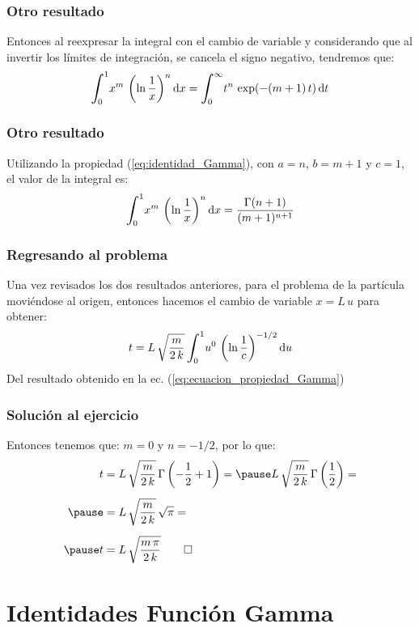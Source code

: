 \documentclass[12pt]{beamer}
\begin{document}
\begin{frame}
\frametitle{Otro resultado}
Entonces al reexpresar la integral con el cambio de variable y considerando que al invertir los límites de integración, se cancela el signo negativo, tendremos que:
\pause
\begin{align*}
\scaleint{6ex}_{\bs 0}^{1} x^{m} \, \left( \ln \dfrac{1}{x} \right)^{n} \dd{x} = \scaleint{6ex}_{\bs 0}^{\infty} t^{n} \, \exp(-(m+1) \, t) \dd{t}
\end{align*}
\end{frame}
\begin{frame}
\frametitle{Otro resultado}
Utilizando la propiedad (\ref{eq:identidad_Gamma}), con $a = n$, $b = m + 1$ y $c = 1$, el valor de la integral es:
\pause 
\begin{align}
\scaleint{6ex}_{\bs 0}^{1} x^{m} \, \left( \ln \dfrac{1}{x} \right)^{n} \dd{x} = \dfrac{\Gamma (n + 1)}{(m + 1)^{n+1}}
\label{eq:ecuacion_propiedad_Gamma}
\end{align}
\end{frame}
\begin{frame}
\frametitle{Regresando al problema}
Una vez revisados los dos resultados anteriores, para el problema de la partícula moviéndose al origen, entonces hacemos el cambio de variable $x = L \, u$ para obtener:
\pause 
\begin{align*}
t = L \, \sqrt{\dfrac{m}{2 \, k}} \, \scaleint{6ex}_{\bs 0}^{1} u^{0} \, \left( \ln \dfrac{1}{c} \right)^{-1/2} \dd{u}
\end{align*}
\pause
Del resultado obtenido en la ec. (\ref{eq:ecuacion_propiedad_Gamma})
\end{frame}
\begin{frame}
\frametitle{Solución al ejercicio}
Entonces tenemos que: $m = 0$ y $n = -1/2$, por lo que:
\pause
\begin{eqnarray*}
\begin{aligned}
t &= L \, \sqrt{\dfrac{m}{2 \, k}} \, \Gamma \left( - \dfrac{1}{2} + 1 \right) = \pause L \, \sqrt{\dfrac{m}{2 \, k}} \, \Gamma \left( \dfrac{1}{2} \right) = \\[0.5em] \pause
&= L \, \sqrt{\dfrac{m}{2 \, k}} \, \sqrt{\pi} = \\[0.5em] \pause
t &= L \, \sqrt{\dfrac{m \, \pi}{2 \, k}} \qed
\end{aligned}
\end{eqnarray*}
\end{frame}

\section{Identidades Función Gamma}
\end{document}
